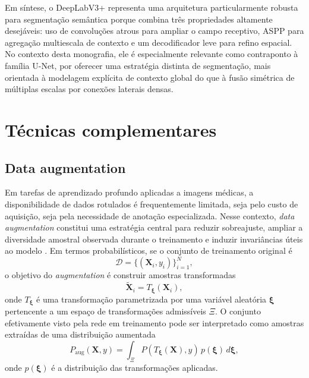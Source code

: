 \documentclass[tcc,capa]{texufpel}
\begin{document}
Em síntese, o DeepLabV3+ representa uma arquitetura particularmente robusta para segmentação semântica porque combina três propriedades altamente desejáveis: uso de convoluções atrous para ampliar o campo receptivo, ASPP para agregação multiescala de contexto e um decodificador leve para refino espacial. No contexto desta monografia, ele é especialmente relevante como contraponto à família U-Net, por oferecer uma estratégia distinta de segmentação, mais orientada à modelagem explícita de contexto global do que à fusão simétrica de múltiplas escalas por conexões laterais densas.

\section{Técnicas complementares}

\subsection{Data augmentation}

Em tarefas de aprendizado profundo aplicadas a imagens médicas, a disponibilidade de dados rotulados é frequentemente limitada, seja pelo custo de aquisição, seja pela necessidade de anotação especializada. Nesse contexto, \textit{data augmentation} constitui uma estratégia central para reduzir sobreajuste, ampliar a diversidade amostral observada durante o treinamento e induzir invariâncias úteis ao modelo \cite{Shorten2019, Yang2022AugSurvey}. Em termos probabilísticos, se o conjunto de treinamento original é
\begin{equation}
	\mathcal{D} = \{(\mathbf{X}_i, y_i)\}_{i=1}^{N},
\end{equation}
o objetivo do \textit{augmentation} é construir amostras transformadas
\begin{equation}
	\tilde{\mathbf{X}}_i = T_{\boldsymbol{\xi}}(\mathbf{X}_i),
\end{equation}
onde \(T_{\boldsymbol{\xi}}\) é uma transformação parametrizada por uma variável aleatória \(\boldsymbol{\xi}\) pertencente a um espaço de transformações admissíveis \(\Xi\). O conjunto efetivamente visto pela rede em treinamento pode ser interpretado como amostras extraídas de uma distribuição aumentada
\begin{equation}
	P_{\text{aug}}(\mathbf{X},y)
	=
	\int_{\Xi} P\!\left(T_{\boldsymbol{\xi}}(\mathbf{X}),y\right)\, p(\boldsymbol{\xi})\, d\boldsymbol{\xi},
\end{equation}
onde \(p(\boldsymbol{\xi})\) é a distribuição das transformações aplicadas.
\end{document}
